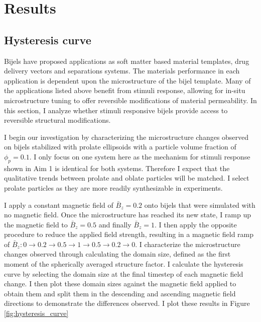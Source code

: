 \section{Results}\label{sec:results_p2}
\subsection{Hysteresis curve}\label{section:hysteresis_curve}

Bijels have proposed applications as soft matter based material templates, drug delivery vectors and separations systems. The materials 
performance in each application is dependent upon the microstructure of the bijel template. Many of the applications listed above benefit 
from stimuli response, allowing for in-situ microstructure tuning to offer reversible modifications of material permeability. In this section, I analyze
whether stimuli responsive bijels provide access to reversible structural modifications.

I begin our investigation by characterizing the microstructure changes observed on bijels stabilized with prolate ellipsoids with a 
particle volume fraction of $\phi_p = 0.1$. I only focus on one system here as the mechanism for stimuli response shown in Aim 1 is identical
for both systems. Therefore I expect that the qualitative trends between prolate and oblate particles will be matched. I select prolate particles
as they are more readily synthesizable in experiments. 

I apply a constant magnetic field of $\bar{B}_z = 0.2$ onto bijels that were simulated 
with no magnetic field. Once the microstructure has reached its new state, I ramp up the magnetic field to $\bar{B}_z = 0.5$ and 
finally $\bar{B}_z = 1$. I then apply the opposite procedure to reduce the applied field strength, resulting in a magnetic field 
ramp of $\bar{B}_z: 0 \rightarrow 0.2 \rightarrow 0.5 \rightarrow 1 \rightarrow 0.5 \rightarrow 0.2 \rightarrow 0$. I characterize the 
microstructure changes observed through calculating the domain size, defined as the first moment of the spherically averaged structure factor. 
I calculate the hysteresis 
curve by selecting the domain size at the final timestep of each magnetic field change. I then plot these domain sizes against the magnetic field 
applied to obtain them and split them in the descending and ascending magnetic field directions to demonstrate the differences observed. I plot 
these results in Figure \ref{fig:hysteresis_curve}

